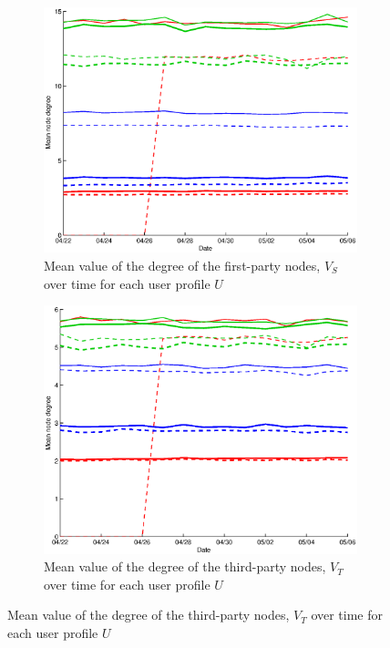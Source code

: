 \documentclass{sig-alternate}
\begin{document}
  \begin{figure}
   \centering
   
   \begin{subfigure}{.45\textwidth}
    \includegraphics[width=\textwidth]{figures/plots/first-means.eps}
    \caption{Mean value of the degree of the first-party nodes, $V_S$ over time for each user profile $U$}
    \label{fig:first_means}
  \end{subfigure}
  
  \begin{subfigure}{.45\textwidth}
    \includegraphics[width=\textwidth]{figures/plots/third-means.eps}
    \caption{Mean value of the degree of the third-party nodes, $V_T$ over time for each user profile $U$}
    \label{fig:third_means}
  \end{subfigure}


\end{figure}
\end{document}
